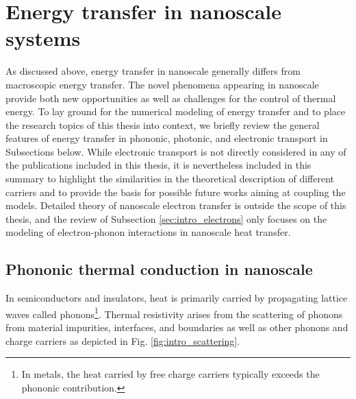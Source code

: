 \section{Energy transfer in nanoscale systems}

As discussed above, energy transfer in nanoscale generally differs from macroscopic energy transfer. The novel phenomena appearing in nanoscale provide both new opportunities as well as challenges for the control of thermal energy. To lay ground for the numerical modeling of energy transfer and to place the research topics of this thesis into context, we briefly review the general features of energy transfer in phononic, photonic, and electronic transport in Subsections below. While electronic transport is not directly considered in any of the publications included in this thesis, it is nevertheless included in this summary to highlight the similarities in the theoretical description of different carriers and to provide the basis for possible future works aiming at coupling the models. Detailed theory of nanoscale electron transfer is outside the scope of this thesis, and the review of Subsection \ref{sec:intro_electrons} only focuses on the modeling of electron-phonon interactions in nanoscale heat transfer. 

\subsection{Phononic thermal conduction in nanoscale}
\label{sec:intro_vib}

In semiconductors and insulators, heat is primarily carried by propagating lattice waves called phonons\footnote{In metals, the heat carried by free charge carriers typically exceeds the phononic contribution.}. Thermal resistivity arises from the scattering of phonons from material impurities, interfaces, and boundaries as well as other phonons and charge carriers \cite{ziman,peierls29} as depicted in Fig. \ref{fig:intro_scattering}. 

